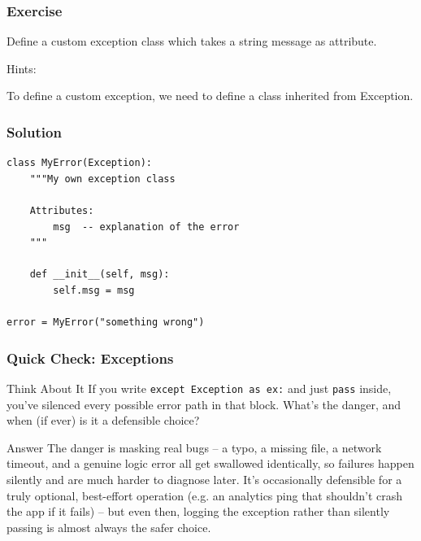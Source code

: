 \begin{frame}[fragile]\frametitle{Exercise}
Define a custom exception class which takes a string message as attribute.

Hints:

To define a custom exception, we need to define a class inherited from Exception.
\end{frame}

\begin{frame}[fragile]\frametitle{Solution}
\begin{lstlisting}
class MyError(Exception):
    """My own exception class

    Attributes:
        msg  -- explanation of the error
    """

    def __init__(self, msg):
        self.msg = msg

error = MyError("something wrong")
\end{lstlisting}
\end{frame}

\begin{frame}[fragile]\frametitle{Quick Check: Exceptions}
\begin{block}{Think About It}
If you write \texttt{except Exception as ex:} and just \texttt{pass} inside, you've silenced every possible error path in that block. What's the danger, and when (if ever) is it a defensible choice?
\end{block}
\pause
\begin{block}{Answer}
The danger is masking real bugs -- a typo, a missing file, a network timeout, and a genuine logic error all get swallowed identically, so failures happen silently and are much harder to diagnose later. It's occasionally defensible for a truly optional, best-effort operation (e.g. an analytics ping that shouldn't crash the app if it fails) -- but even then, logging the exception rather than silently passing is almost always the safer choice.
\end{block}
\end{frame}



